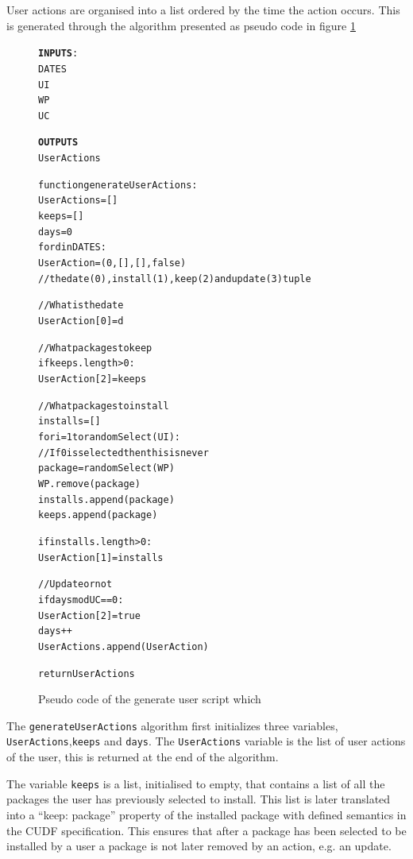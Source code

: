 User actions are organised into a list ordered by the time the action occurs.
This is generated through the algorithm presented as pseudo code in figure \ref{generateuser}

\begin{figure}[htp]
\begin{center}
\begin{alltt}
\textbf{INPUTS}:
DATES
UI
WP
UC

\textbf{OUTPUTS}
UserActions

function generateUserActions: 
    UserActions = []
    keeps = []
    days = 0
    for d in DATES:
        UserAction = (0, [], [], false) 
        //the date(0), install(1), keep(2) and update(3) tuple
        
        //What is the date
        UserAction[0] = d
        
        //What packages to keep
        if keeps.length > 0:
            UserAction[2] = keeps 
            
        //What packages to install
        installs = []
        for i = 1 to randomSelect(UI):
            //If 0 is selected then this is never
            package = randomSelect(WP)
            WP.remove(package)
            installs.append(package)
            keeps.append(package)
            
        if installs.length > 0:
            UserAction[1] = installs 
        
        //Update or not
        if days mod UC == 0:
            UserAction[2] = true
        days++
        UserActions.append(UserAction)
        
    return UserActions
\end{alltt}
\caption[generateUser script]{Pseudo code of the generate user script which}
\label{generateuser}
\end{center}
\end{figure}



The \verb+generateUserActions+ algorithm first initializes three variables, \verb+UserActions+,\verb+keeps+ and \verb+days+.
The \verb+UserActions+ variable is the list of user actions of the user, this is returned at the end of the algorithm.

The variable \verb+keeps+ is a list, initialised to empty, that contains a list of all the packages the user has previously selected to install.
This list is later translated into a ``keep: package'' property of the installed package with defined semantics in the CUDF specification.
This ensures that after a package has been selected to be installed by a user a package is not later removed by an action, e.g. an update.

